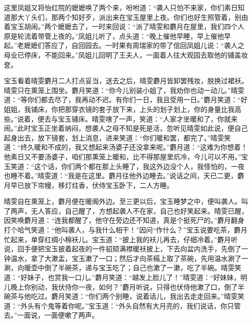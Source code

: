 这里凤姐又将怡红院的嬷嬷唤了两个来，吩咐道：“袭人只怕不来家，你们素日知道那大丫头们，那两个知好歹，派出来在宝玉屋里上夜。你们也好生照管着，别由着宝玉胡闹。”两个嬷嬷去了，一时来回说：“派了晴雯和麝月在屋里，我们四个人原是轮流着带管上夜的。”凤姐儿听了，点头道：“晚上催他早睡，早上催他早起。”老嬷嬷们答应了，自回园去。一时果有周瑞家的带了信回凤姐儿说：“袭人之母业已停床，不能回来。”凤姐儿回明了王夫人，一面着人往大观园去取他的铺盖妆奁。

宝玉看着晴雯麝月二人打点妥当，送去之后，晴雯麝月皆卸罢残妆，脱换过裙袄。晴雯只在熏笼上围坐。麝月笑道：“你今儿别装小姐了，我劝你也动一动儿。”晴雯道：“等你们都去尽了，我再动不迟。有你们一日，我且受用一日。”麝月笑道：“好姐姐，我铺床，你把那穿衣镜的套子放下来，上头的划子划上，你的身量比我高些。”说着，便去与宝玉铺床。晴雯嗐了一声，笑道：“人家才坐暖和了，你就来闹。”此时宝玉正坐着纳闷，想袭人之母不知是死是活，忽听见晴雯如此说，便自己起身出去，放下镜套，划上消息，进来笑道：“你们暖和罢，都完了。”晴雯笑道：“终久暖和不成的，我又想起来汤婆子还没拿来呢。”麝月道：“这难为你想着！他素日又不要汤婆子，咱们那熏笼上暖和，比不得那屋里炕冷，今儿可以不用。”宝玉笑道：“这个话，你们两个都在那上头睡了，我这外边没个人，我怪怕的，一夜也睡不着。”晴雯道：“我是在这里。麝月往他外边睡去。”说话之间，天已二更，麝月早已放下帘幔，移灯炷香，伏侍宝玉卧下，二人方睡。

晴雯自在熏笼上，麝月便在暖阁外边。至三更以后，宝玉睡梦之中，便叫袭人。叫了两声，无人答应，自己醒了，方想起袭人不在家，自己也好笑起来。晴雯已醒，因笑唤麝月道：“连我都醒了，他守在旁边还不知道，真是个挺死尸的。”麝月翻身打个哈气笑道：“他叫袭人，与我什么相干！”因问“作什么？”宝玉说要吃茶，麝月忙起来，单穿红绸小棉袄儿。宝玉道：“披上我的袄儿再去，仔细冷着。”麝月听说，回手便把宝玉披着起夜的一件貂颏满襟暖袄披上，下去向盆内洗手，先倒了一钟温水，拿了大漱盂，宝玉漱了一口；然后才向茶槅上取了茶碗，先用温水涮了一涮，向暖壶中倒了半碗茶，递与宝玉吃了；自己也漱了一漱，吃了半碗。晴雯笑道：“好妹子，也赏我一口儿。”麝月笑道：“越发上脸儿了！”晴雯道：“好妹妹，明儿晚上你别动，我伏侍你一夜，如何？”麝月听说，只得也伏侍他漱了口，倒了半碗茶与他吃过。麝月笑道：“你们两个别睡，说着话儿，我出去走走回来。”晴雯笑道：“外头有个鬼等着你呢。”宝玉道：“外头自然有大月亮的，我们说话，你只管去。”一面说，一面便嗽了两声。

